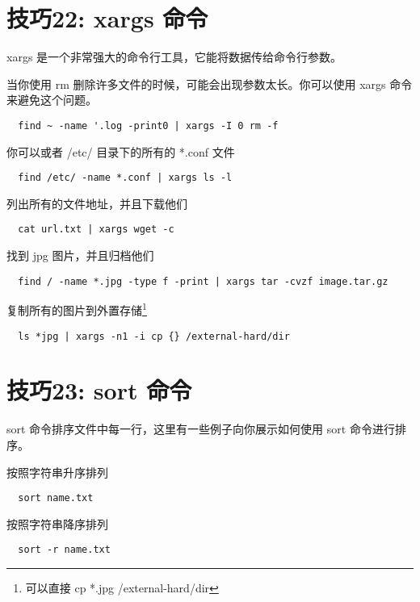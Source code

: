 \documentclass[UTF8]{ctexart}
\begin{document}
\section*{技巧22: xargs 命令}
xargs 是一个非常强大的命令行工具，它能将数据传给命令行参数。

当你使用 rm 删除许多文件的时候，可能会出现参数太长。你可以使用 xargs 命令来避免这个问题。
\begin{lstlisting}
  find ~ -name '.log -print0 | xargs -I 0 rm -f 
\end{lstlisting}
你可以或者 /etc/ 目录下的所有的 *.conf 文件
\begin{lstlisting}
  find /etc/ -name *.conf | xargs ls -l
\end{lstlisting}
列出所有的文件地址，并且下载他们
\begin{lstlisting}
  cat url.txt | xargs wget -c
\end{lstlisting}
找到 jpg 图片，并且归档他们
\begin{lstlisting}
  find / -name *.jpg -type f -print | xargs tar -cvzf image.tar.gz 
\end{lstlisting}
复制所有的图片到外置存储\footnote{可以直接 cp *.jpg /external-hard/dir}
\begin{lstlisting}
  ls *jpg | xargs -n1 -i cp {} /external-hard/dir
\end{lstlisting}


\section*{技巧23: sort 命令}
sort 命令排序文件中每一行，这里有一些例子向你展示如何使用 sort 命令进行排序。

按照字符串升序排列
\begin{lstlisting}
  sort name.txt
\end{lstlisting}
按照字符串降序排列
\begin{lstlisting}
  sort -r name.txt
\end{lstlisting}
\end{document}
